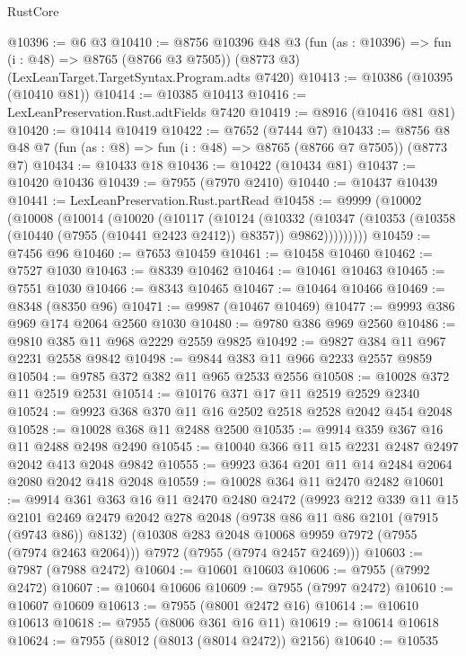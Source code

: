 \begin{lexlean}{RustCore}
\begin{coremodule}
@10396 := @6 @3
@10410 := @8756
    @10396
    @48
    @3
    (fun (as : @10396) => fun (i : @48) => @8765 (@8766 @3 @7505))
    (@8773 @3)
    (LexLeanTarget.TargetSyntax.Program.adts @7420)
@10413 := @10386 (@10395 (@10410 @81))
@10414 := @10385 @10413
@10416 := LexLeanPreservation.Rust.adtFields @7420
@10419 := @8916 (@10416 @81 @81)
@10420 := @10414 @10419
@10422 := @7652 (@7444 @7)
@10433 := @8756 @8 @48 @7 (fun (as : @8) => fun (i : @48) => @8765 (@8766 @7 @7505)) (@8773 @7)
@10434 := @10433 @18
@10436 := @10422 (@10434 @81)
@10437 := @10420 @10436
@10439 := @7955 (@7970 @2410)
@10440 := @10437 @10439
@10441 := LexLeanPreservation.Rust.partRead
@10458 := @9999
    (@10002
      (@10008
        (@10014
          (@10020
            (@10117
              (@10124
                (@10332
                  (@10347
                    (@10353 (@10358 (@10440 (@7955 (@10441 @2423 @2412)) @8357)) @9862)))))))))
@10459 := @7456 @96
@10460 := @7653 @10459
@10461 := @10458 @10460
@10462 := @7527 @1030
@10463 := @8339 @10462
@10464 := @10461 @10463
@10465 := @7551 @1030
@10466 := @8343 @10465
@10467 := @10464 @10466
@10469 := @8348 (@8350 @96)
@10471 := @9987 (@10467 @10469)
@10477 := @9993 @386 @969 @174 @2064 @2560 @1030
@10480 := @9780 @386 @969 @2560
@10486 := @9810 @385 @11 @968 @2229 @2559 @9825
@10492 := @9827 @384 @11 @967 @2231 @2558 @9842
@10498 := @9844 @383 @11 @966 @2233 @2557 @9859
@10504 := @9785 @372 @382 @11 @965 @2533 @2556
@10508 := @10028 @372 @11 @2519 @2531
@10514 := @10176 @371 @17 @11 @2519 @2529 @2340
@10524 := @9923 @368 @370 @11 @16 @2502 @2518 @2528 @2042 @454 @2048
@10528 := @10028 @368 @11 @2488 @2500
@10535 := @9914 @359 @367 @16 @11 @2488 @2498 @2490
@10545 := @10040 @366 @11 @15 @2231 @2487 @2497 @2042 @413 @2048 @9842
@10555 := @9923 @364 @201 @11 @14 @2484 @2064 @2080 @2042 @418 @2048
@10559 := @10028 @364 @11 @2470 @2482
@10601 := @9914
    @361
    @363
    @16
    @11
    @2470
    @2480
    @2472
    (@9923
      @212
      @339
      @11
      @15
      @2101
      @2469
      @2479
      @2042
      @278
      @2048
      (@9738 @86 @11 @86 @2101 (@7915 (@9743 @86)) @8132)
      (@10308 @283 @2048 @10068 @9959 @7972 (@7955 (@7974 @2463 @2064)))
      @7972
      (@7955 (@7974 @2457 @2469)))
@10603 := @7987 (@7988 @2472)
@10604 := @10601 @10603
@10606 := @7955 (@7992 @2472)
@10607 := @10604 @10606
@10609 := @7955 (@7997 @2472)
@10610 := @10607 @10609
@10613 := @7955 (@8001 @2472 @16)
@10614 := @10610 @10613
@10618 := @7955 (@8006 @361 @16 @11)
@10619 := @10614 @10618
@10624 := @7955 (@8012 (@8013 (@8014 @2472)) @2156)
@10640 := @10535

\end{coremodule}
\end{lexlean}
